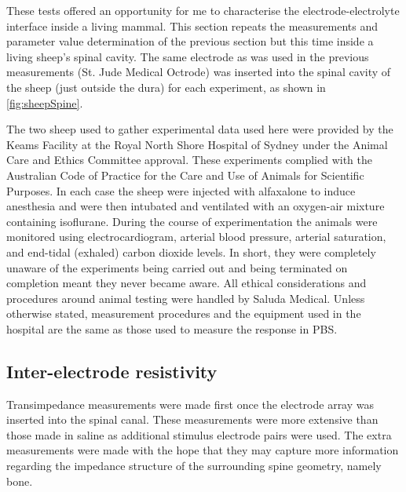   These tests offered an opportunity for me to characterise the electrode-electrolyte interface inside a living mammal.
  This section repeats the measurements and parameter value determination of the previous section but this time inside a living sheep's spinal cavity.
  The same electrode as was used in the previous measurements (St. Jude Medical Octrode) was inserted into the spinal cavity of the sheep (just outside the dura) for each experiment, as shown in \cref{fig:sheepSpine}.

  The two sheep used to gather experimental data used here were provided by the Keams Facility at the Royal North Shore Hospital of Sydney under the Animal Care and Ethics Committee approval.
  These experiments complied with the Australian Code of Practice for the Care and Use of Animals for Scientific Purposes.
  In each case the sheep were injected with alfaxalone to induce anesthesia and were then intubated and ventilated with an oxygen-air mixture containing isoflurane.
  During the course of experimentation the animals were monitored using electrocardiogram, arterial blood pressure, arterial saturation, and end-tidal (exhaled) carbon dioxide levels.
  In short, they were completely unaware of the experiments being carried out and being terminated on completion meant they never became aware.
  All ethical considerations and procedures around animal testing were handled by Saluda Medical.
  Unless otherwise stated, measurement procedures and the equipment used in the hospital are the same as those used to measure the response in PBS.

  \subsection{Inter-electrode resistivity}
  
    Transimpedance measurements were made first once the electrode array was inserted into the spinal canal.
    These measurements were more extensive than those made in saline as additional stimulus electrode pairs were used.
    The extra measurements were made with the hope that they may capture more information regarding the impedance structure of the surrounding spine geometry, namely bone.
  
